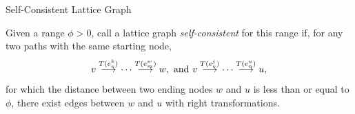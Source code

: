 \begin{frame}{Self-Consistent Lattice Graph}
  \begin{definition}
    \small{Given a range $\phi > 0$, call a lattice graph
      \textit{self-consistent} for this range if, for any two paths with the
      same starting node,
      $${v}\overset{T(e_v^{k})}{\longrightarrow}{\cdots}\overset{T(e_m^{w})}{\longrightarrow}{w}, \text{ and }{v}\overset{T(e_v^{j})}{\longrightarrow}{\cdots}\overset{T(e_n^{u})}{\longrightarrow}{u},$$
      for which the distance between two ending nodes $w$ and $u$ is
      less than or equal to $\phi$, there exist edges between $w$ and
      $u$ with right transformations.}
  \end{definition}
\end{frame}
